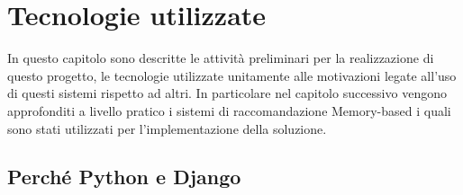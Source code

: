 \chapter{Tecnologie utilizzate}\label{chp:02-technologies}
In questo capitolo sono descritte le attività preliminari per la realizzazione di questo progetto, le tecnologie utilizzate 
unitamente alle motivazioni legate all'uso di questi sistemi rispetto ad altri. In particolare nel capitolo successivo vengono 
approfonditi a livello pratico i sistemi di raccomandazione Memory-based i quali sono stati utilizzati per l'implementazione della 
soluzione.
%
\section{Perché Python e Django}

